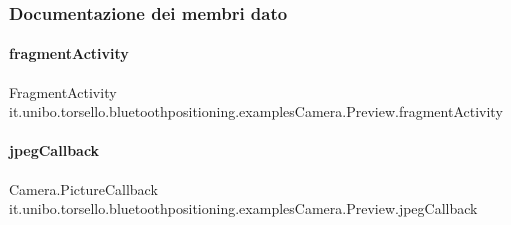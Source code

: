 \subsubsection{Documentazione dei membri dato}
\hypertarget{classit_1_1unibo_1_1torsello_1_1bluetoothpositioning_1_1examplesCamera_1_1Preview_afb962539b64017465860fcbf9a903370_afb962539b64017465860fcbf9a903370}{}\label{classit_1_1unibo_1_1torsello_1_1bluetoothpositioning_1_1examplesCamera_1_1Preview_afb962539b64017465860fcbf9a903370_afb962539b64017465860fcbf9a903370} 
\paragraph{\texorpdfstring{fragment\+Activity}{fragmentActivity}}
{\footnotesize\ttfamily Fragment\+Activity it.\+unibo.\+torsello.\+bluetoothpositioning.\+examples\+Camera.\+Preview.\+fragment\+Activity\hspace{0.3cm}{\ttfamily [package]}}

\hypertarget{classit_1_1unibo_1_1torsello_1_1bluetoothpositioning_1_1examplesCamera_1_1Preview_a66d23d916709e2283ca48282d29175e4_a66d23d916709e2283ca48282d29175e4}{}\label{classit_1_1unibo_1_1torsello_1_1bluetoothpositioning_1_1examplesCamera_1_1Preview_a66d23d916709e2283ca48282d29175e4_a66d23d916709e2283ca48282d29175e4} 
\paragraph{\texorpdfstring{jpeg\+Callback}{jpegCallback}}
{\footnotesize\ttfamily Camera.\+Picture\+Callback it.\+unibo.\+torsello.\+bluetoothpositioning.\+examples\+Camera.\+Preview.\+jpeg\+Callback\hspace{0.3cm}{\ttfamily [package]}}

